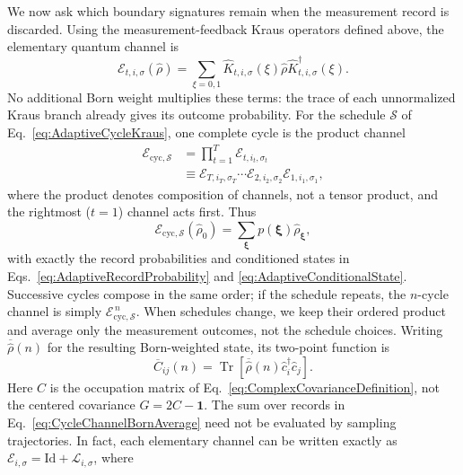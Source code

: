 \documentclass[aps,prb,twocolumn,superscriptaddress,longbibliography,floatfix]{revtex4-2}
\theoremstyle{plain}
\theoremstyle{definition}
\theoremstyle{remark}
\begin{document}
We now ask which boundary signatures remain when the measurement record is
discarded.  Using the measurement-feedback Kraus operators defined above,
the elementary quantum channel is
\begin{equation}
 \mathcal E_{t,i,\sigma}(\hat\rho)
 =\sum_{\xi=0,1}\hat K_{t,i,\sigma}(\xi)\hat\rho
 \hat K_{t,i,\sigma}^{\dagger}(\xi).
 \label{eq:ElementaryAveragedChannel}
\end{equation}
No additional Born weight multiplies these terms: the trace of each
unnormalized Kraus branch already gives its outcome probability.
For the schedule $\mathcal S$ of Eq.~\eqref{eq:AdaptiveCycleKraus}, one
complete cycle is the product channel
\begin{align}
 \mathcal E_{\mathrm{cyc},\mathcal S}
 &=\prod_{t=1}^{T}\mathcal E_{t,i_t,\sigma_t}
 \nonumber\\
 &\equiv\mathcal E_{T,i_T,\sigma_T}\cdots
 \mathcal E_{2,i_2,\sigma_2}\mathcal E_{1,i_1,\sigma_1},
 \label{eq:ProductAveragedChannel}
\end{align}
where the product denotes composition of channels, not a tensor product,
and the rightmost ($t=1$) channel acts first.  Thus
\begin{equation}
 \mathcal E_{\mathrm{cyc},\mathcal S}(\hat\rho_0)
 =\sum_{\boldsymbol\xi}p(\boldsymbol\xi)
 \hat\rho_{\boldsymbol\xi},
 \label{eq:CycleChannelBornAverage}
\end{equation}
with exactly the record probabilities and conditioned states in
Eqs.~\eqref{eq:AdaptiveRecordProbability} and
\eqref{eq:AdaptiveConditionalState}.  Successive cycles compose in the same
order; if the schedule repeats, the $n$-cycle channel is simply
$\mathcal E_{\mathrm{cyc},\mathcal S}^{\,n}$.  When schedules change, we keep
their ordered product and average only the measurement outcomes, not the
schedule choices.  Writing $\overline{\hat\rho}(n)$ for the resulting
Born-weighted state, its two-point function is
\begin{equation}
 \overline C_{ij}(n)
 =\operatorname{Tr}\!\left[\overline{\hat\rho}(n)
 \hat c_i^\dagger\hat c_j\right].
 \label{eq:TrajectoryAveragedCorrelation}
\end{equation}
Here $C$ is the occupation matrix of
Eq.~\eqref{eq:ComplexCovarianceDefinition}, not the centered covariance
$G=2C-\mathbf{1}$.  The sum over records in
Eq.~\eqref{eq:CycleChannelBornAverage} need not be evaluated by sampling
trajectories.  In fact, each elementary channel can be written exactly as
$\mathcal E_{i,\sigma}=\mathrm{Id}+\mathcal L_{i,\sigma}$, where
\end{document}
